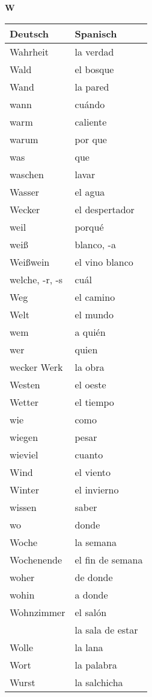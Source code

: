 \begin{flushright}\begin{Huge}\textbf{W}\end{Huge}\end{flushright}

\begin{longtable}{p{} p{}} 
\textbf{Deutsch}     & \textbf{Spanisch}                                       \\ \hline
\hline
\endhead %
Wahrheit & la verdad\\
Wald & el bosque\\
Wand & la pared\\
wann & cuándo\\
warm & caliente\\
warum & por que\\
was & que\\
waschen & lavar\\
Wasser & el agua\\
Wecker & el despertador\\
weil & porqué\\
weiß & blanco, -a\\
Weißwein & el vino blanco\\
welche, -r, -s & cuál \\
Weg & el camino\\
Welt & el mundo\\
wem & a quién\\
wer & quien\\wecker
Werk & la obra\\
Westen & el oeste\\
Wetter & el tiempo\\
wie & como\\
wiegen & pesar\\
wieviel & cuanto \\
Wind & el viento\\
Winter & el invierno\\
wissen & saber\\
wo & donde\\
Woche & la semana\\
Wochenende & el fin de semana\\
woher & de donde\\
wohin & a donde\\
Wohnzimmer & el salón\\
~ & la sala de estar\\
Wolle & la lana\\
Wort & la palabra\\
Wurst & la salchicha\\
\end{longtable}
